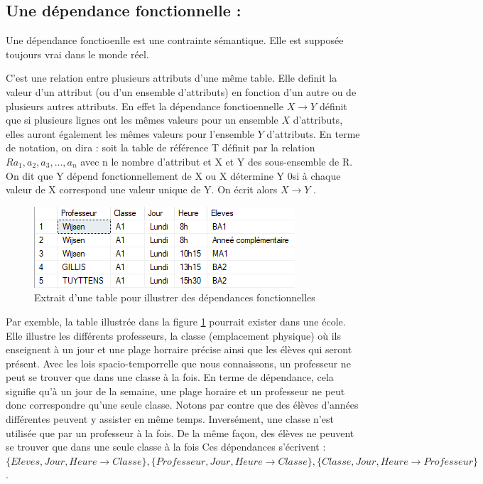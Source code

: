 \documentclass[12pt, a4paper, oneside, titlepage]{book}%
\begin{document}
\subsection{Une dépendance fonctionnelle : }
Une dépendance fonctioenlle est une contrainte sémantique. Elle est supposée toujours vrai dans le monde réel.

C'est une relation entre plusieurs attributs d'une même table. Elle definit la valeur d'un attribut (ou d'un ensemble d'attributs) en fonction d'un autre ou de plusieurs autres attributs. En effet la dépendance fonctioennelle $ X \rightarrow Y$ définit que si plusieurs lignes ont les mêmes valeurs pour un ensemble $X$ d'attributs, elles auront également les mêmes valeurs pour l'ensemble $Y$ d'attributs.
En terme de notation, on dira : soit la table de référence T définit par la relation $R{a_1, a_2, a_3,...,a_n}$ avec n le nombre d'attribut et X et Y des sous-ensemble de R. On dit que \og Y dépend fonctionnellement de X \fg ou \og X détermine Y \fg 0si à chaque valeur de X correspond une valeur unique de Y. On écrit alors \og $ X \rightarrow Y$ \fg.

\begin{figure}[ht]
	\center
	\includegraphics{DF.png}
	\caption{\label{picDF} Extrait d'une table pour illustrer des dépendances fonctionnelles}
\end{figure}

Par exemble, la table illustrée dans la figure \ref{picDF} pourrait exister dans une école. Elle illustre les différents professeurs, la classe (emplacement physique) où ils enseignent à un jour et une plage horraire précise ainsi que les élèves qui seront présent. Avec les lois spacio-temporrelle que nous connaissons, un professeur ne peut se trouver que dans une classe à la fois. En terme de dépendance, cela signifie qu'à un jour de la semaine, une plage horaire et un professeur ne peut donc correspondre qu'une seule classe. Notons par contre que des élèves d'années différentes peuvent y assister en même temps. Inversément, une classe n'est utilisée que par un professeur à la fois. De la même façon, des élèves ne peuvent se trouver que dans une seule classe à la fois
Ces dépendances s'écrivent : $\{Eleves, Jour, Heure \rightarrow Classe\}, \{Professeur, Jour, Heure \rightarrow Classe\}, \{Classe, Jour, Heure \rightarrow Professeur\}$.
\end{document}
